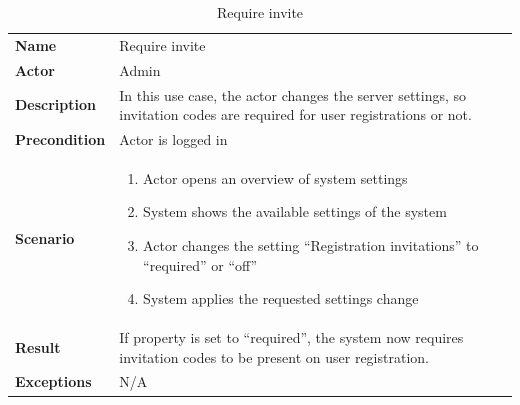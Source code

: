 \begin{table}[ht]
    \caption{Require invite}
    \begin{tabular}{|L{5cm}|L{10cm}|}
        \toprule
        \textbf{Name}         & Require invite     \\
        \textbf{Actor}        & Admin              \\
        \textbf{Description} & In this use case, the actor changes the server settings, so invitation codes are
        required for user registrations or not. \\
        \textbf{Precondition} & Actor is logged in \\
        \textbf{Scenario} &
        \vspace{-0.75cm}
        \begin{enumerate}
            \setlength\itemsep{-0.5em}
            \item Actor opens an overview of system settings
            \item System shows the available settings of the system
            \item Actor changes the setting \enquote{Registration invitations} to \enquote{required} or \enquote{off}
            \item  System applies the requested settings change
        \end{enumerate} \\[-0.5cm]
        \textbf{Result} & If property is set to \enquote{required}, the system now requires invitation codes to
        be present on user registration. \\
        \textbf{Exceptions}   & N/A                \\
        \bottomrule
    \end{tabular}
    \label{tab:table34}
\end{table}

